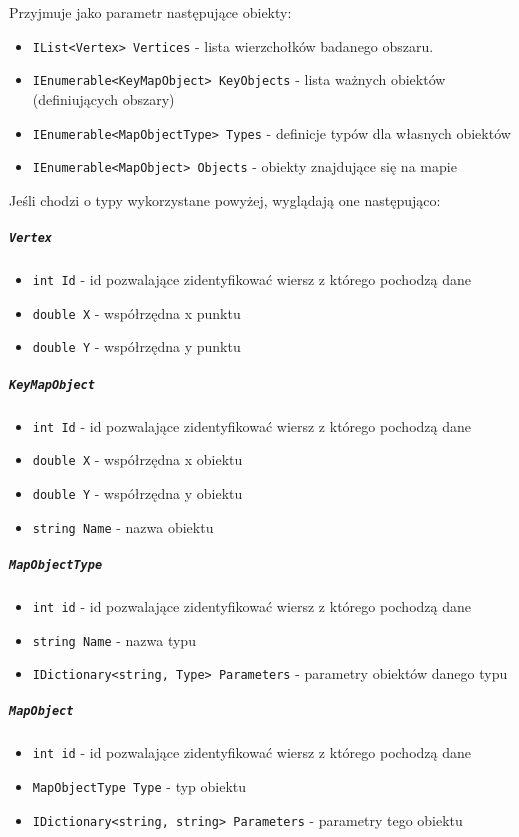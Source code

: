 \documentclass[a4paper, 10pt, titlepage]{article}
\newcommand{\code}[1]{\texttt{#1}}
\begin{document}
Przyjmuje jako parametr następujące obiekty:
\begin{itemize}
\item \code{IList<Vertex> Vertices} - lista wierzchołków badanego obszaru.
\item \code{IEnumerable<KeyMapObject> KeyObjects} - lista ważnych obiektów (definiujących obszary)
\item \code{IEnumerable<MapObjectType> Types} - definicje typów dla własnych obiektów
\item \code{IEnumerable<MapObject> Objects} - obiekty znajdujące się na mapie
\end{itemize}

Jeśli chodzi o typy wykorzystane powyżej, wyglądają one następująco:

\subparagraph{\code{Vertex}}
\begin{itemize}
\item \code{int Id} - id pozwalające zidentyfikować wiersz z którego pochodzą dane
\item \code{double X} - współrzędna x punktu
\item \code{double Y} - współrzędna y punktu
\end{itemize}

\subparagraph{\code{KeyMapObject}}
\begin{itemize}
\item \code{int Id} - id pozwalające zidentyfikować wiersz z którego pochodzą dane
\item \code{double X} - współrzędna x obiektu
\item \code{double Y} - współrzędna y obiektu
\item \code{string Name} - nazwa obiektu
\end{itemize}

\subparagraph{\code{MapObjectType}}
\begin{itemize}
\item \code{int id} - id pozwalające zidentyfikować wiersz z którego pochodzą dane
\item \code{string Name} - nazwa typu
\item \code{IDictionary<string, Type> Parameters} - parametry obiektów danego typu
\end{itemize}

\subparagraph{\code{MapObject}}
\begin{itemize}
\item \code{int id} - id pozwalające zidentyfikować wiersz z którego pochodzą dane
\item \code{MapObjectType Type} - typ obiektu
\item \code{IDictionary<string, string> Parameters} - parametry tego obiektu
\end{itemize}
\end{document}
